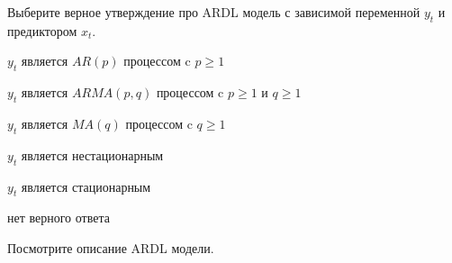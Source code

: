 
\begin{question}
Выберите верное утверждение про ARDL модель с зависимой переменной \(y_t\) и предиктором \(x_t\).
\begin{answerlist}
  \item \(y_t\) является \(AR(p)\) процессом c \(p \geq 1\)
  \item \(y_t\) является \(ARMA(p, q)\) процессом c \(p \geq 1\) и \(q \geq 1\)
  \item \(y_t\) является \(MA(q)\) процессом c \(q \geq 1\)
  \item \(y_t\) является нестационарным
  \item \(y_t\) является стационарным
  \item нет верного ответа
\end{answerlist}
\end{question}

\begin{solution}
Посмотрите описание ARDL модели.
\end{solution}


